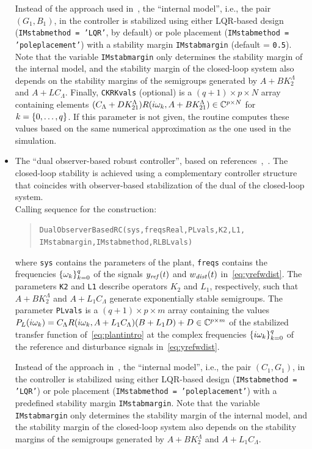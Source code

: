 \documentclass[11pt, a4paper]{amsart}
\newcommand{\CL}{C_\Lambda}
\theoremstyle{definition}
\numberwithin{equation}{section}
\newcommand{\yref}{y_{\mbox{\scriptsize\textit{ref}}}}
\newcommand{\wdist}{w_{\mbox{\scriptsize\textit{dist}}}}
\begin{document}
\begin{itemize}
     Instead of the approach used in~\cite{Pau16a}, the ``internal model'', i.e., the pair $(G_1,B_1)$, in the controller is stabilized using either LQR-based design (\texttt{IMstabmethod = 'LQR'}, by default) or pole placement (\texttt{IMstabmethod = 'poleplacement'}) with a stability margin \texttt{IMstabmargin} (default = \texttt{0.5}). Note that the variable \texttt{IMstabmargin} only determines the stability margin of the internal model, and the stability margin of the closed-loop system also depends on the stability margins of the semigroups generated by $A+BK_2^\Lambda$ and $A+L\CL$.
     Finally, \texttt{CKRKvals} (optional) is a $(q+1)\times p\times N$ array containing elements $(\CL +DK_{21}^\Lambda)R(i\gw_k,A+BK_{21}^\Lambda)\in \C^{p\times N}$ for $k=\List[0]{q}$. If this parameter is not given, the routine computes these values based on the same numerical approximation as the one used in the simulation.
  \item The ``dual observer-based robust controller'', based on references~,~. The closed-loop stability is achieved using a complementary controller structure that coincides with observer-based stabilization of the dual of the closed-loop system.\\[1ex]
      Calling sequence for the construction:\\[-1ex]
     \begin{quotation}
       \texttt{DualObserverBasedRC(sys,freqsReal,PLvals,K2,L1,\\
	 \phantom{a}\hspace{2.7cm} IMstabmargin,IMstabmethod,RLBLvals)}
     \end{quotation}
     \medskip
     where \texttt{sys} contains the parameters of the plant, \texttt{freqs} contains the frequencies $\set{\gw_k}_{k=0}^q$ of the signals $\yref(t)$ and $\wdist(t)$ in~\eqref{eq:yrefwdist}. The parameters \texttt{K2} and \texttt{L1} describe operators $K_2$ and $L_1$, respectively, such that $A+BK_2^\Lambda$ and $A+L_1\CL$ generate exponentially stable semigroups. 
     The parameter \texttt{PLvals} is a $(q+1)\times p\times m$ array containing the values $P_L(i\gw_k)=\CL R(i\gw_k,A+L_1\CL)(B+L_1D)+D\in \C^{p\times m}$ of the stabilized transfer function of~\eqref{eq:plantintro} at the complex frequencies $\set{i\gw_k}_{k=0}^q$ of the reference and disturbance signals in~\eqref{eq:yrefwdist}.

     Instead of the approach in~\cite{Pau16a}, the ``internal model'', i.e., the pair $(C_1,G_1)$, in the controller is stabilized using either LQR-based design (\texttt{IMstabmethod = 'LQR'}) or pole placement (\texttt{IMstabmethod = 'poleplacement'}) with a predefined stability margin \texttt{IMstabmargin}. Note that the variable \texttt{IMstabmargin} only determines the stability margin of the internal model, and the stability margin of the closed-loop system also depends on the stability margins of the semigroups generated by $A+BK_2^\Lambda$ and $A+L_1\CL$.


\end{itemize}
\end{document}
